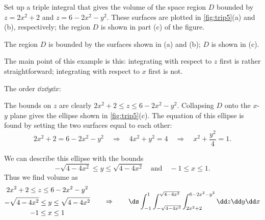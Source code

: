 \begin{example}\label{ex_trip5}
Set up a triple integral that gives the volume of the space region $D$ bounded by $z= 2x^2+2$ and $z=6-2x^2-y^2$. These surfaces are plotted in \autoref{fig:trip5}(a) and (b), respectively; the region $D$ is shown in part (c) of the figure.

\noindent\begin{minipage}[t]{\linewidth}\noindent%
\captionsetup{type=figure}%
\caption{The region $D$ is bounded by the surfaces shown in (a) and (b); $D$ is shown in (c).}
\label{fig:trip5}
\end{minipage}
\solution
The main point of this example is this: integrating with respect to $z$ first is rather straightforward; integrating with respect to $x$ first is not.\bigskip

\noindent The order $\dd z\dd y\dd x$:\bigskip

The bounds on $z$ are clearly $2x^2+2\leq z\leq 6-2x^2-y^2$. Collapsing $D$ onto the $x$-$y$ plane gives the ellipse shown in \autoref{fig:trip5}(c). The equation of this ellipse is found by setting the two surfaces equal to each other: 
\[2x^2+2 = 6-2x^2-y^2\quad \Rightarrow\quad 4x^2+y^2=4\quad \Rightarrow\quad x^2+\frac{y^2}4=1.\]

We can describe this ellipse with the bounds 
\[-\sqrt{4-4x^2} \leq y\leq \sqrt{4-4x^2}\quad \text{and}\quad -1\leq x\leq 1.\]
Thus we find volume as
\[
	\begin{gathered}
		2x^2+2\leq z\leq 6-2x^2-y^2\\
		-\sqrt{4-4x^2}\leq y\leq \sqrt{4-4x^2}\\
		-1\leq x\leq 1
	\end{gathered} 
	\qquad\Rightarrow\qquad
	\ds\int_{-1}^1\int_{-\sqrt{4-4x^2}}^{\sqrt{4-4x^2}}\int_{2x^2+2}^{6-2x^2-y^2}\dd z\dd y\dd x 
\]


\end{example}
